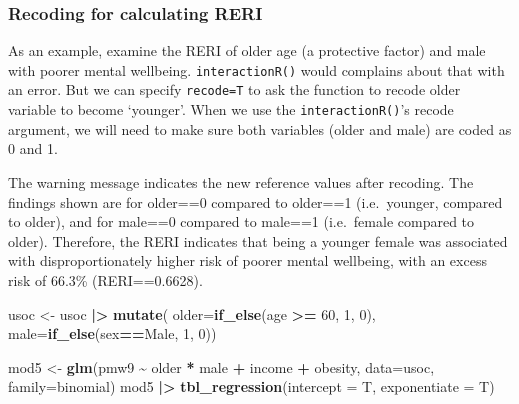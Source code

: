 \documentclass[
]{book}
\newenvironment{Shaded}{\begin{snugshade}}{\end{snugshade}}
\newcommand{\AttributeTok}[1]{\textcolor[rgb]{0.13,0.29,0.53}{#1}}
\newcommand{\DecValTok}[1]{\textcolor[rgb]{0.00,0.00,0.81}{#1}}
\newcommand{\FunctionTok}[1]{\textcolor[rgb]{0.13,0.29,0.53}{\textbf{#1}}}
\newcommand{\NormalTok}[1]{#1}
\newcommand{\OtherTok}[1]{\textcolor[rgb]{0.56,0.35,0.01}{#1}}
\newcommand{\SpecialCharTok}[1]{\textcolor[rgb]{0.81,0.36,0.00}{\textbf{#1}}}
\newcommand{\StringTok}[1]{\textcolor[rgb]{0.31,0.60,0.02}{#1}}
\begin{document}
\subsubsection{Recoding for calculating RERI}\label{recoding-for-calculating-reri}

As an example, examine the RERI of older age (a protective factor) and male with poorer mental wellbeing. \texttt{interactionR()} would complains about that with an error. But we can specify \texttt{recode=T} to ask the function to recode older variable to become `younger'. When we use the \texttt{interactionR()}'s recode argument, we will need to make sure both variables (older and male) are coded as 0 and 1.

The warning message indicates the new reference values after recoding. The findings shown are for older==0 compared to older==1 (i.e.~younger, compared to older), and for male==0 compared to male==1 (i.e.~female compared to older). Therefore, the RERI indicates that being a younger female was associated with disproportionately higher risk of poorer mental wellbeing, with an excess risk of 66.3\% (RERI==0.6628).

\begin{Shaded}
\begin{Highlighting}[]
\NormalTok{usoc }\OtherTok{\textless{}{-}}\NormalTok{ usoc }\SpecialCharTok{|\textgreater{}} 
  \FunctionTok{mutate}\NormalTok{(}
    \AttributeTok{older=}\FunctionTok{if\_else}\NormalTok{(age }\SpecialCharTok{\textgreater{}=} \DecValTok{60}\NormalTok{, }\DecValTok{1}\NormalTok{, }\DecValTok{0}\NormalTok{), }
    \AttributeTok{male=}\FunctionTok{if\_else}\NormalTok{(sex}\SpecialCharTok{==}\StringTok{\textquotesingle{}Male\textquotesingle{}}\NormalTok{, }\DecValTok{1}\NormalTok{, }\DecValTok{0}\NormalTok{))}

\NormalTok{mod5 }\OtherTok{\textless{}{-}} \FunctionTok{glm}\NormalTok{(pmw9 }\SpecialCharTok{\textasciitilde{}}\NormalTok{ older }\SpecialCharTok{*}\NormalTok{ male }\SpecialCharTok{+}\NormalTok{ income }\SpecialCharTok{+}\NormalTok{ obesity, }\AttributeTok{data=}\NormalTok{usoc, }\AttributeTok{family=}\NormalTok{binomial)}
\NormalTok{mod5 }\SpecialCharTok{|\textgreater{}} \FunctionTok{tbl\_regression}\NormalTok{(}\AttributeTok{intercept =}\NormalTok{ T, }\AttributeTok{exponentiate =}\NormalTok{ T)}
\end{Highlighting}
\end{Shaded}
\end{document}
